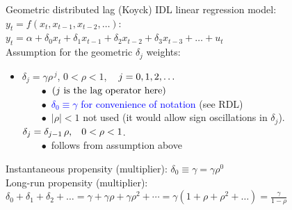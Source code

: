 \documentclass{beamer}
\begin{document}
\begin{frame}{Geometric distributed lag (Koyck) }
IDL linear regression model: $y_t = f(x_t, x_{t-1}, x_{t-2}, \dots)$: 
\\ \vspace{0.3cm}
$ y_t = \alpha + \delta_0 x_t + \delta_1 x_{t-1} + \delta_2 x_{t-2} + \delta_3 x_{t-3} 
+ \dots + u_t$ \\ \vspace{0.3cm}
Assumption for the geometric $\delta_j$ weights:
\begin{itemize}
\item $ \delta_{j} = \gamma \rho^{\,j}$, \hspace{0.3cm} $0 < \rho < 1 $, $\hspace{0.3cm} j=0,1,2,\dots $\\
\smallskip
~~~~$\bullet$~$\left( j \textnormal{~is the lag operator here} \right)$\\
~~~~$\bullet$~\textcolor{blue}{$\delta_0 \equiv \gamma$ for convenience of notation} (see RDL)\\
~~~~$\bullet$~$|\rho|<1$ not used (it would allow sign oscillations in $ \delta_{j}$).\\
\smallskip
$\delta_j = \delta_{j-1}\, \rho, \hspace{0.3cm} 0 < \rho < 1 $.\\
~~~~$\bullet$~follows from assumption above 
\end{itemize}
\vspace{0.3cm}
Instantaneous propensity (multiplier): $ \delta_0 \equiv \gamma = \gamma \rho^0 $ 
\\ \vspace{0.3cm}
Long-run propensity (multiplier):
\\ \vspace{0.3cm}
\footnotesize
$\delta_0+\delta_1+\delta_2 + \dots=\gamma + \gamma \rho + \gamma \rho^2 + \cdots = \gamma(1+\rho+\rho^2+\dots)=\frac{\gamma}{1-\rho}$
\end{frame}
\end{document}
